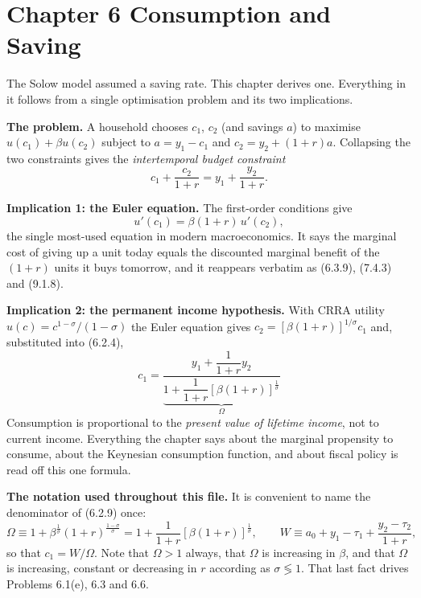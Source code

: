 \documentclass[12pt, letterpaper]{article}
\begin{document}
\tableofcontents
\newpage

\section{Chapter 6 \quad Consumption and Saving}

\begin{tcolorbox}[theorybox,title={Chapter 6 Overview}]
The Solow model assumed a saving rate. This chapter derives one. Everything in it follows
from a single optimisation problem and its two implications.

\smallskip
\textbf{The problem.} A household chooses $c_1$, $c_2$ (and savings $a$) to maximise
$u(c_1)+\beta u(c_2)$ subject to $a=y_1-c_1$ and $c_2=y_2+(1+r)a$. Collapsing the two
constraints gives the \emph{intertemporal budget constraint}
\[
c_1+\frac{c_2}{1+r}=y_1+\frac{y_2}{1+r} .
\tag{6.2.4}
\]

\smallskip
\textbf{Implication 1: the Euler equation.} The first-order conditions give
\[
u'(c_1)=\beta(1+r)\,u'(c_2) ,
\tag{6.2.8}
\]
the single most-used equation in modern macroeconomics. It says the marginal cost of giving
up a unit today equals the discounted marginal benefit of the $(1+r)$ units it buys
tomorrow, and it reappears verbatim as (6.3.9), (7.4.3) and (9.1.8).

\smallskip
\textbf{Implication 2: the permanent income hypothesis.} With CRRA utility
$u(c)=c^{1-\sigma}/(1-\sigma)$ the Euler equation gives $c_2=[\beta(1+r)]^{1/\sigma}c_1$
and, substituted into (6.2.4),
\[
c_1=\frac{y_1+\dfrac{1}{1+r}y_2}
         {\underbrace{1+\dfrac{1}{1+r}\left[\beta(1+r)\right]^{\frac{1}{\sigma}}}_{\textstyle\Omega}}
\tag{6.2.9}
\]
Consumption is proportional to the \emph{present value of lifetime income}, not to current
income. Everything the chapter says about the marginal propensity to consume, about the
Keynesian consumption function, and about fiscal policy is read off this one formula.

\smallskip
\textbf{The notation used throughout this file.} It is convenient to name the denominator
of (6.2.9) once:
\[
\Omega\equiv 1+\beta^{\frac{1}{\sigma}}(1+r)^{\frac{1-\sigma}{\sigma}}
=1+\frac{1}{1+r}\left[\beta(1+r)\right]^{\frac{1}{\sigma}} ,
\qquad
W\equiv a_0+y_1-\tau_1+\frac{y_2-\tau_2}{1+r},
\]
so that $c_1=W/\Omega$. Note that $\Omega>1$ always, that $\Omega$ is increasing in $\beta$,
and that $\Omega$ is increasing, constant or decreasing in $r$ according as
$\sigma\lessgtr1$. That last fact drives Problems 6.1(e), 6.3 and 6.6.


\end{tcolorbox}
\end{document}
